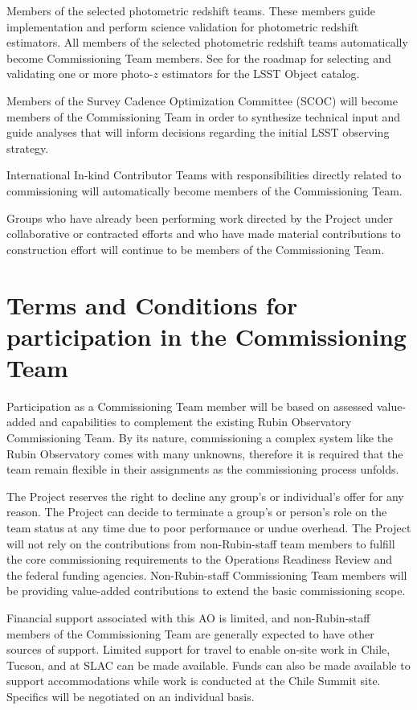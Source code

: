 \documentclass[SE,authoryear,toc]{lsstdoc}
\begin{document}
Members of the selected photometric redshift teams. These members guide implementation and perform science validation for photometric redshift estimators. All members of the selected photometric redshift teams automatically become Commissioning Team members. See  for the roadmap for selecting and validating one or more photo-$z$ estimators for the LSST Object catalog.  

Members of the Survey Cadence Optimization Committee (SCOC) will become members of the Commissioning Team in order to synthesize technical input and guide analyses that will inform decisions regarding the initial LSST observing strategy. 

International In-kind Contributor Teams with responsibilities directly related to commissioning will automatically become members of the Commissioning Team.

Groups who have already been performing work directed by the Project under collaborative or contracted efforts and who have made material contributions to construction effort will continue to be members of the Commissioning Team. 

\section{Terms and Conditions for participation in the Commissioning Team}
\label{terms}

Participation as a Commissioning Team member will be based on assessed value-added and capabilities to complement the existing Rubin Observatory Commissioning Team. By its nature, commissioning a complex system like the Rubin Observatory comes with many unknowns, therefore it is required that the team remain flexible in their assignments as the commissioning process unfolds. 

The Project reserves the right to decline any group's or individual's offer for any reason.  The Project can decide to terminate a group's or person's role on the team status at any time due to poor performance or undue overhead. The Project will not rely on the contributions from non-Rubin-staff team members to fulfill the core commissioning requirements to the Operations Readiness Review and the federal funding agencies. Non-Rubin-staff Commissioning Team members will be providing value-added contributions to extend the basic commissioning scope.

Financial support associated with this AO is limited, and non-Rubin-staff members of the Commissioning Team are generally expected to have other sources of support. Limited support for travel to enable on-site work in Chile, Tucson, and at SLAC can be made available.  Funds can also be made available to support accommodations while work is conducted at the Chile Summit site. Specifics will be negotiated on an individual basis.
\end{document}
